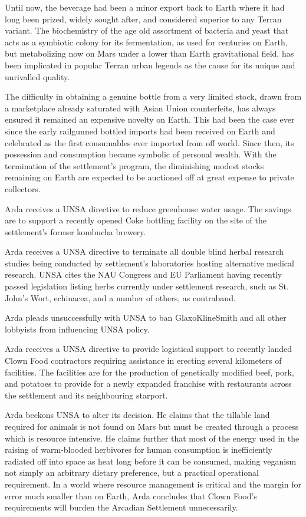 Until now, the beverage had been a minor export back to Earth where it had long been prized, widely sought after, and considered superior to any Terran variant. The biochemistry of the age old assortment of bacteria and yeast that acts as a symbiotic colony for its fermentation, as used for centuries on Earth, but metabolizing now on Mars under a lower than Earth gravitational field, has been implicated in popular Terran urban legends as the cause for its unique and unrivalled quality. 

The difficulty in obtaining a genuine bottle from a very limited stock, drawn from a marketplace already saturated with Asian Union counterfeits, has always ensured it remained an expensive novelty on Earth. This had been the case ever since the early railgunned bottled imports had been received on Earth and celebrated as the first consumables ever imported from off world. Since then, its possession and consumption became symbolic of personal wealth. With the termination of the settlement's program, the diminishing modest stocks remaining on Earth are expected to be auctioned off at great expense to private collectors.
\StopTimelineDate

Arda receives a UNSA directive to reduce greenhouse water usage. The savings are to support a recently opened Coke bottling facility on the site of the settlement's former kombucha brewery.
\StopTimelineDate

Arda receives a UNSA directive to terminate all double blind herbal research studies being conducted by settlement's laboratories hosting alternative medical research. UNSA cites the NAU Congress and EU Parliament having recently passed legislation listing herbs currently under settlement research, such as St. John's Wort, echinacea, and a number of others, as contraband. 

Arda pleads unsuccessfully with UNSA to ban GlaxoKlineSmith and all other lobbyists from influencing UNSA policy.
\StopTimelineDate

Arda receives a UNSA directive to provide logistical support to recently landed Clown Food contractors requiring assistance in erecting several kilometers of facilities. The facilities are for the production of genetically modified beef, pork, and potatoes to provide for a newly expanded franchise with restaurants across the settlement and its neighbouring starport.

Arda beckons UNSA to alter its decision. He claims that the tillable land required for animals is not found on Mars but must be created through a process which is resource intensive. He claims further that most of the energy used in the raising of warm-blooded herbivores for human consumption is inefficiently radiated off into space as heat long before it can be consumed, making veganism not simply an arbitrary dietary preference, but a practical operational requirement. In a world where resource management is critical and the margin for error much smaller than on Earth, Arda concludes that Clown Food's requirements will burden the Arcadian Settlement unnecessarily. 

